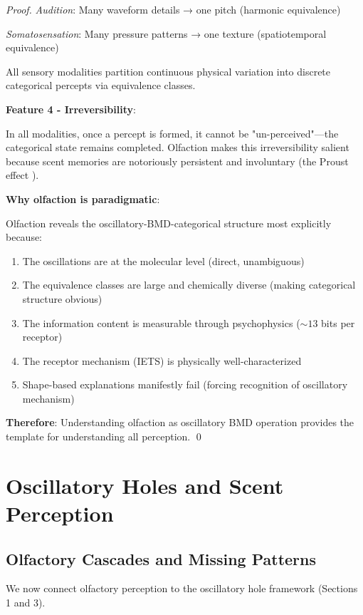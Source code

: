 \documentclass[12pt,a4paper]{article}
\begin{document}
\begin{proof}
\textit{Audition}: Many waveform details → one pitch (harmonic equivalence)

\textit{Somatosensation}: Many pressure patterns → one texture (spatiotemporal equivalence)

All sensory modalities partition continuous physical variation into discrete categorical percepts via equivalence classes.

\textbf{Feature 4 - Irreversibility}:

In all modalities, once a percept is formed, it cannot be "un-perceived"—the categorical state remains completed. Olfaction makes this irreversibility salient because scent memories are notoriously persistent and involuntary (the Proust effect \cite{chu2003proust}).

\textbf{Why olfaction is paradigmatic}:

Olfaction reveals the oscillatory-BMD-categorical structure most explicitly because:
\begin{enumerate}
\item The oscillations are at the molecular level (direct, unambiguous)
\item The equivalence classes are large and chemically diverse (making categorical structure obvious)
\item The information content is measurable through psychophysics ($\sim 13$ bits per receptor)
\item The receptor mechanism (IETS) is physically well-characterized
\item Shape-based explanations manifestly fail (forcing recognition of oscillatory mechanism)
\end{enumerate}

\textbf{Therefore}: Understanding olfaction as oscillatory BMD operation provides the template for understanding all perception. \qed
\end{proof}

\section{Oscillatory Holes and Scent Perception}

\subsection{Olfactory Cascades and Missing Patterns}

We now connect olfactory perception to the oscillatory hole framework (Sections 1 and 3).
\end{document}
